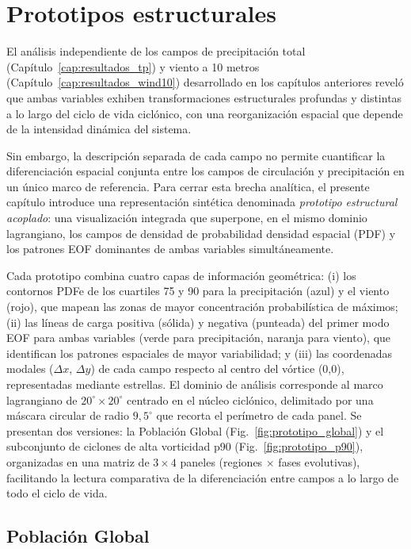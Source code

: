 \chapter{Prototipos estructurales}\label{cap:prototipos}


El análisis independiente de los campos de precipitación total (Capítulo~\ref{cap:resultados_tp}) y viento a 10 metros (Capítulo~\ref{cap:resultados_wind10}) desarrollado en los capítulos anteriores reveló que ambas variables exhiben transformaciones estructurales profundas y distintas a lo largo del ciclo de vida ciclónico, con una reorganización espacial que depende de la intensidad dinámica del sistema.

Sin embargo, la descripción separada de cada campo no permite cuantificar la diferenciación espacial conjunta entre los campos de circulación y precipitación en un único marco de referencia. 
Para cerrar esta brecha analítica, el presente capítulo introduce una representación sintética denominada \textit{prototipo estructural acoplado}: una visualización integrada que superpone, en el mismo dominio lagrangiano, los campos de densidad de probabilidad densidad espacial (PDF) y los patrones EOF dominantes de ambas variables simultáneamente.

Cada prototipo combina cuatro capas de información geométrica: (i) los contornos PDFe de los cuartiles 75 y 90 para la precipitación (azul) y el viento (rojo), que mapean las zonas de mayor concentración probabilística de máximos; (ii) las líneas de carga positiva (sólida) y negativa (punteada) del primer modo EOF para ambas variables (verde para precipitación, naranja para viento), que identifican los patrones espaciales de mayor variabilidad; y (iii) las coordenadas modales ($\Delta x$, $\Delta y$) de cada campo respecto al centro del vórtice (0,0), representadas mediante estrellas. El dominio de análisis corresponde al marco lagrangiano de $20^{\circ} \times 20^{\circ}$ centrado en el núcleo ciclónico, delimitado por una máscara circular de radio $9{,}5^{\circ}$ que recorta el perímetro de cada panel. Se presentan dos versiones: la Población Global (Fig.~\ref{fig:prototipo_global}) y el subconjunto de ciclones de alta vorticidad p90 (Fig.~\ref{fig:prototipo_p90}), organizadas en una matriz de $3 \times 4$ paneles (regiones $\times$ fases evolutivas), facilitando la lectura comparativa de la diferenciación entre campos a lo largo de todo el ciclo de vida.

\section{Población Global}\label{sec:prototipo_global}

